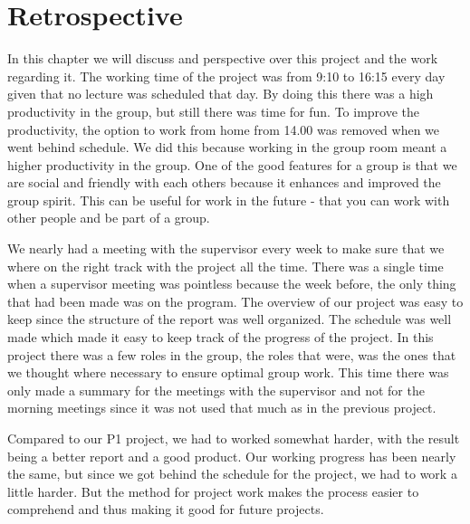 \chapter{Retrospective}
In this chapter we will discuss and perspective over this project and the work regarding it.
The working time of the project was from 9:10 to 16:15 every day given that no lecture was scheduled that day. By doing this there was a high productivity in the group, but still there was time for fun. To improve the productivity, the option to work from home from 14.00 was removed when we went behind schedule.
We did this because working in the group room meant a higher productivity in the group. One of the good features for a group is that we are social and friendly with each others because it enhances and improved the group spirit. This can be useful for work in the future - that you can work with other people and be part of a group.

We nearly had a meeting with the supervisor every week to make sure that we where on the right track with the project all the time. There was a single time when a supervisor meeting was pointless because the week before, the only thing that had been made was on the program. The overview of our project was easy to keep since the structure of the report was well organized. The schedule was well made which made it easy to keep track of the progress of the project. In this project there was a few roles in the group, the roles that were, was the ones that we thought where necessary to ensure optimal group work. This time there was only made a summary for the meetings with the supervisor and not for the morning meetings since it was not used that much as in the previous project. 

Compared to our P1 project, we had to worked somewhat harder, with the result being a better report and a good product. Our working progress has been nearly the same, but since we got behind the schedule for the project, we had to work a little harder. But the method for project work makes the process easier to comprehend and thus making it good for future projects.